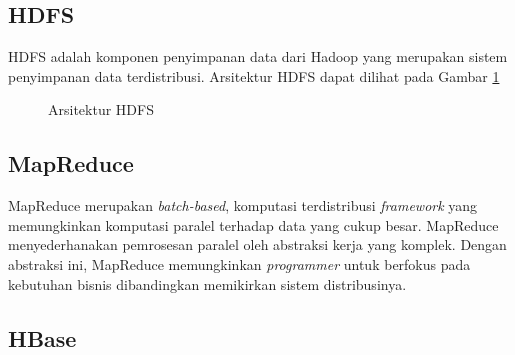 \subsection{HDFS}
\label{subsec:hdfs}

HDFS adalah komponen penyimpanan data dari Hadoop yang merupakan sistem penyimpanan data terdistribusi. Arsitektur HDFS dapat dilihat pada Gambar \ref{fig:arsitektur_hdfs}

\begin{figure}
\centering
{}
\caption[Arsitektur HDFS]{Arsitektur HDFS} 
\label{fig:arsitektur_hdfs}
\end{figure}

\subsection{MapReduce}
\label{subsec:mapreduce}

\hspace{0,5cm}MapReduce merupakan \textit{batch-based}, komputasi terdistribusi \textit{framework} yang memungkinkan komputasi paralel terhadap data yang cukup besar. MapReduce menyederhanakan pemrosesan paralel oleh abstraksi kerja yang komplek. Dengan abstraksi ini, MapReduce memungkinkan \textit{programmer} untuk berfokus pada kebutuhan bisnis dibandingkan memikirkan sistem distribusinya.

\subsection{HBase}
\label{subsec:hbase}

